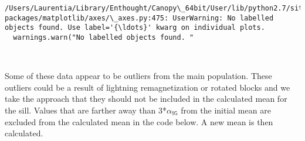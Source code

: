 \documentclass{article}
\begin{document}
    \begin{Verbatim}[commandchars=\\\{\}]
/Users/Laurentia/Library/Enthought/Canopy\_64bit/User/lib/python2.7/site-packages/matplotlib/axes/\_axes.py:475: UserWarning: No labelled objects found. Use label='{\ldots}' kwarg on individual plots.
  warnings.warn("No labelled objects found. "
    \end{Verbatim}

    \begin{center}
    \end{center}
    { \hspace*{\fill} \\}
    
    Some of these data appear to be outliers from the main population. These
outliers could be a result of lightning remagnetization or rotated
blocks and we take the approach that they should not be included in the
calculated mean for the sill. Values that are farther away than
3*\(\alpha_{95}\) from the initial mean are excluded from the calculated
mean in the code below. A new mean is then calculated.
\end{document}
